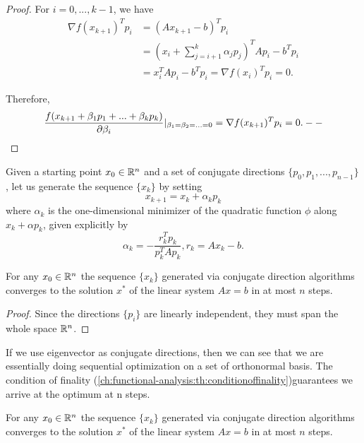 \begin{refsection}
\begin{proof}
For $i=0,...,k-1$, we have 
\begin{align*}
\nabla f(x_{k+1})^T p_i &= (Ax_{k+1} - b)^Tp_i \\ 
&=(x_i + \sum_{j=i+1}^k \alpha_j p_j)^TAp_i - b^Tp_i\\
&=x_i^TAp_i - b^Tp_i = \nabla f(x_i)^T p_i = 0.
\end{align*}

Therefore,
$$\frac{f(x_{k+1} + \beta_1p_1 + ... + \beta_k p_k)}{\partial \beta_i}|_{\beta_1=\beta_2=... = 0} = \nabla f(x_{k+1})^T p_i = 0.--$$

\end{proof}




\begin{definition}
Given a starting point $x_0 \in \mathbb{R}^n$ and a set of conjugate directions $\{p_0,p_1,...,p_{n-1}\}$, let us generate the sequence $\{x_k\}$ by setting
$$x_{k+1} = x_k + \alpha_k p_k$$
where $\alpha_k$ is the one-dimensional minimizer of the quadratic function $\phi$ along $x_k + \alpha p_k$, given explicitly by
$$\alpha_k = -\frac{r_k^Tp_k}{p_k^TAp_k}, r_k = Ax_k - b.$$
\end{definition}

\begin{lemma}\cite[103]{nocedal2006numerical}
For any $x_0\in \mathbb{R}^n$ the sequence $\{x_k\}$ generated via conjugate direction algorithms converges to the solution $x^*$ of the linear system $Ax=b$ in at most $n$ steps.
\end{lemma}
\begin{proof}
Since the directions $\{p_i\}$ are linearly independent, they must span the whole space $\mathbb{R}^n$.
\end{proof}


\begin{remark}
	If we use eigenvector as conjugate directions, then we can see that we are essentially doing sequential optimization on a set of orthonormal basis. The condition of finality (\autoref{ch:functional-analysis:th:conditionoffinality})guarantees we arrive at the optimum at n steps. 
\end{remark}


\begin{lemma}\cite[103]{nocedal2006numerical}
	For any $x_0\in \mathbb{R}^n$ the sequence $\{x_k\}$ generated via conjugate direction algorithms converges to the solution $x^*$ of the linear system $Ax=b$ in at most $n$ steps.
\end{lemma}


\end{refsection}
